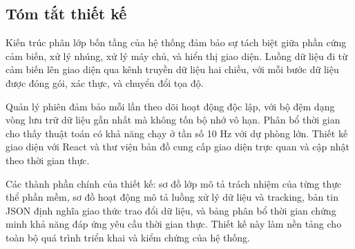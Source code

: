 \begin{table}[H]
\centering
\caption{Kịch bản thời gian tự động phục hồi kết nối giao diện theo thuật toán Exponential Backoff}
\label{tab:exponential-backoff-schedule}
\end{table}

\subsection{Tóm tắt thiết kế}

\hspace{0.5cm} Kiến trúc phân lớp bốn tầng của hệ thống đảm bảo sự tách biệt giữa phần cứng cảm biến, xử lý nhúng, xử lý máy chủ, và hiển thị giao diện. Luồng dữ liệu đi từ cảm biến lên giao diện qua kênh truyền dữ liệu hai chiều, với mỗi bước dữ liệu được đóng gói, xác thực, và chuyển đổi tọa độ.

Quản lý phiên đảm bảo mỗi lần theo dõi hoạt động độc lập, với bộ đệm dạng vòng lưu trữ dữ liệu gần nhất mà không tốn bộ nhớ vô hạn. Phân bổ thời gian cho thấy thuật toán có khả năng chạy ở tần số 10 Hz với dự phòng lớn. Thiết kế giao diện với React và thư viện bản đồ cung cấp giao diện trực quan và cập nhật theo thời gian thực.

Các thành phần chính của thiết kế: sơ đồ lớp mô tả trách nhiệm của từng thực thể phần mềm, sơ đồ hoạt động mô tả luồng xử lý dữ liệu và tracking, bản tin JSON định nghĩa giao thức trao đổi dữ liệu, và bảng phân bổ thời gian chứng minh khả năng đáp ứng yêu cầu thời gian thực. Thiết kế này làm nền tảng cho toàn bộ quá trình triển khai và kiểm chứng của hệ thống.
